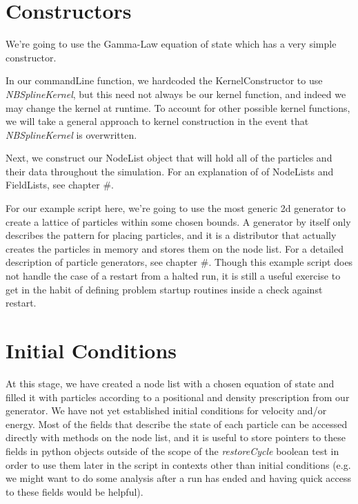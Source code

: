 \documentclass[11pt]{memoir}
\begin{document}
\section{Constructors}

We're going to use the Gamma-Law equation of state which has a very simple constructor.



In our commandLine function, we hardcoded the KernelConstructor to use \textit{NBSplineKernel}, but this need not always be our kernel function, and indeed we may change the kernel at runtime.
To account for other possible kernel functions, we will take a general approach to kernel construction in the event that \textit{NBSplineKernel} is overwritten.



Next, we construct our NodeList object that will hold all of the particles and their data throughout the simulation.
For an explanation of of NodeLists and FieldLists, see chapter \#.



For our example script here, we're going to use the most generic 2d generator to create a lattice of particles within some chosen bounds.
A generator by itself only describes the pattern for placing particles, and it is a distributor that actually creates the particles in memory and stores them on the node list.
For a detailed description of particle generators, see chapter \#.
Though this example script does not handle the case of a restart from a halted run, it is still a useful exercise to get in the habit of defining problem startup routines inside a check against restart.



\section{Initial Conditions}

At this stage, we have created a node list with a chosen equation of state and filled it with particles according to a positional and density prescription from our generator.
We have not yet established initial conditions for velocity and/or energy.
Most of the fields that describe the state of each particle can be accessed directly with methods on the node list, and it is useful to store pointers to these fields in python objects outside of the scope of the \textit{restoreCycle} boolean test in order to use them later in the script in contexts other than initial conditions (e.g. we might want to do some analysis after a run has ended and having quick access to these fields would be helpful).
\end{document}
